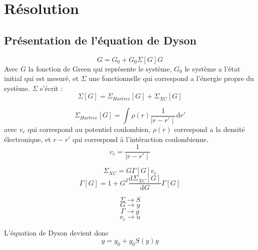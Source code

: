 \documentclass{beamer}
\begin{document}
\section{R\'esolution}

\subsection{Pr\'esentation de l'\'equation de Dyson}

\begin{frame}
\begin{equation}
	G = G_0 + G_0 \Sigma[G] G
\end{equation}
Avec $G$ la fonction de Green qui repr\'esente le syst\`eme, $G_0$ le syst\`eme a l'\'etat initial qui est mesur\'e, et $\Sigma$ une fonctionnelle qui correspond a l'\'energie propre du syst\`eme.
$\Sigma$ s'\'ecrit :
\begin{equation}
	\Sigma[G] = \Sigma_{Hartree}[G] + \Sigma_{XC}[G]
\end{equation}

\end{frame}


\begin{frame}
 \begin{equation}
	\Sigma_{Hartree}[G] = \int \rho(r) \frac{1}{\mid r - r'\mid }\mathrm{d}r' 
\end{equation}
avec $v_c$ qui correspond au potentiel coulombien, $\rho(r)$ correspond a la densit\'e \'electronique, et $r-r'$
qui correspond à l'int\'eraction coulombienne.
\begin{equation}
	v_c =  \frac{1}{\mid r - r'\mid }
\end{equation}
\end{frame}

\begin{frame}
 \begin{equation}
	\Sigma_{XC} = G \Gamma[G] v_c
\end{equation}
\begin{equation}
	\Gamma[G] = 1 + G^2 \frac{\mathrm{d} \Sigma_{XC}[G]}{\mathrm{d}G} \Gamma[G]
\end{equation}
\end{frame}
\begin{frame}
 \begin{equation}
	\Sigma \longrightarrow S
\end{equation}
\begin{equation}
	G \longrightarrow y
\end{equation}
\begin{equation}
	\Gamma \longrightarrow g
\end{equation}
\begin{equation}
	v_c \longrightarrow u
\end{equation}

L'\'equation de Dyson devient donc
\begin{equation}
\label{dyson}
	y = y_0 + y_0 S(y) y
\end{equation}
\end{frame}
\end{document}
